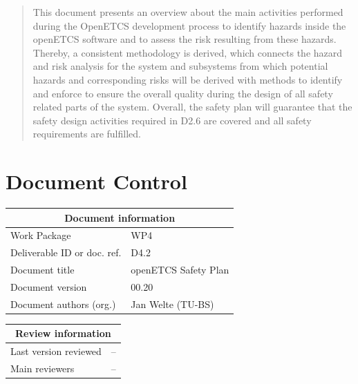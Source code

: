 \documentclass{template/openetcs_report}
\begin{document}



\begin{abstract}
This document presents an overview about the main activities performed during the OpenETCS development process to identify hazards inside the openETCS software and to assess the risk resulting from these hazards. Thereby, a consistent methodology is derived, which connects the hazard and risk analysis for the system and subsystems from which potential hazards and corresponding risks will be derived with methods to identify and enforce  to ensure the overall quality during the design of all safety related parts of the system. Overall, the safety plan will guarantee that the safety design activities required in D2.6 are covered and all safety requirements are fulfilled. 
\end{abstract}

\maketitle
\tableofcontents
\listoffiguresandtables
\newpage

\chapter{Document Control}

\begin{tabular}{|p{4.4cm}|p{8.7cm}|}
\hline
\multicolumn{2}{|c|}{Document information} \\
\hline
Work Package &  WP4  \\
Deliverable ID or doc. ref. & D4.2\\
\hline
Document title & openETCS Safety Plan\\
Document version & 00.20 \\
Document authors (org.)  & Jan Welte (TU-BS)\\
\hline
\end{tabular}

\begin{tabular}{|p{4.4cm}|p{8.7cm}|}
\hline
\multicolumn{2}{|c|}{Review information} \\
\hline
Last version reviewed & -- \\
\hline
Main reviewers & -- \\
\hline
\end{tabular}
\end{document}
